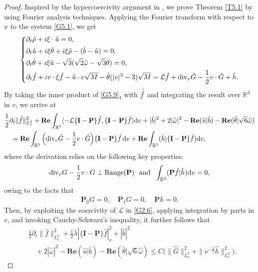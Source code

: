 \documentclass[reqno,11pt]{amsart}
\theoremstyle{plain}
\numberwithin{equation}{section}
\begin{document}
\begin{proof}
Inspired by the hypercoercivity argument in \cite{SK-HMJ-1985}, we prove Theorem \ref{T5.1} by using Fourier analysis techniques.
Applying the Fourier transform with respect to $x$ to the system \eqref{G5.1}, we get
\begin{equation}\label{G5.9}\left\{
\begin{aligned}
&\partial_t \hat{\rho}+i \xi \cdot \hat{u}=0, \\
&\partial_t \hat{u} +i \xi \hat{\theta}+i \xi \hat{\rho}-(\hat{b}-\hat{u})=0, \\
&\partial_t \hat{\theta} +i \xi \hat{u}-\sqrt{3}(\sqrt{2} \hat{\omega}-\sqrt{3} \hat{\theta})=0 ,\\
&\partial_t \hat{f}+i v \cdot \xi \hat{f}-\hat{u} \cdot v \sqrt{M}-\hat{\theta} (|v|^2-3) \sqrt{M}
=\mathcal{L} \hat{f}+{\rm div}_v  \hat{G}-\frac{1}{2} v \cdot \hat{G}+\hat{h}.
\end{aligned}  \right.
\end{equation}
By taking the inner product of \eqref{G5.9}$_4$ with $\Bar{\hat{f}}$ and integrating the result over $\mathbb{R}^3$ in $v$, we arrive at  
\begin{align*}  
& \frac{1}{2} \partial_t\|\hat{f}\|_{L_v^2}^2 + \mathbf{Re} \int_{\mathbb{R}^3} \langle -\mathcal{L}\{\mathbf{I}-\mathbf{P}\} \hat{f}, \{\mathbf{I}-\mathbf{P}\} \hat{f} \rangle \mathrm{d} v + |\hat{b}|^2 + 2|\hat{\omega}|^2 - \mathbf{Re}(\hat{u}|\hat{b}) - \mathbf{Re}(\hat{\theta}|\sqrt{6} \hat{\omega}) \nonumber\\  
& \quad = \mathbf{Re} \int_{\mathbb{R}^3} \Big( {\rm div}_v \hat{G} - \frac{1}{2} v \cdot \hat{G} \Big) \{\mathbf{I}-\mathbf{P}\} \hat{f} \, \mathrm{d} v + \mathbf{Re} \int_{\mathbb{R}^3} (\hat{h}| \{\mathbf{I}-\mathbf{P}\} \hat{f}) \mathrm{d} v,  
\end{align*}  
where the derivation relies on the following key properties:  
\begin{gather*}  
{\rm div}_v G - \frac{1}{2} v \cdot G \perp {\rm Range}(\mathbf{P})  \ \ \text{and} \ \ \int_{\mathbb{R}^3} (\mathbf{P} \hat{f}|\hat{h}) \mathrm{d} v = 0,  
\end{gather*}  
owing to the facts that  
\begin{align*}  
\mathbf{P}_{0}G = 0, \quad \mathbf{P}_{1}G = 0, \quad \mathbf{P}h=0.  
\end{align*}
Then, by exploiting the coercivity of $\mathcal{L}$ in \eqref{G2.6}, applying integration by parts in $v$, and invoking   Cauchy-Schwarz's inequality, it further follows that  
\begin{align}\label{G5.10}
& \frac{1}{2} \partial_t \|\hat{f}\|_{L_v^2}^2 +\frac{1}{2}\bar\lambda|\{\mathbf{I}-\mathbf{P}\} \hat{f}|_\nu^2+|\hat{b}|^2\nonumber\\
 &\quad  +2|\hat{\omega}|^2- \mathbf{Re}(\hat{u}|\hat{b}) - \mathbf{Re}(\hat{\theta}|\sqrt{6} \hat{\omega}) \leq  C\big(\|\hat{G}\|_{L_v^2}^2+\|\nu^{-\frac{1}{2}} \hat{h}\|_{L_v^2}^2\big) .    
\end{align}


\end{proof}
\end{document}
